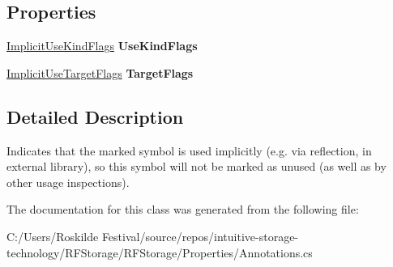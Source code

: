 \subsection*{Properties}
\begin{DoxyCompactItemize}
\item 
\mbox{\label{class_r_f_storage_1_1_used_implicitly_attribute_ab9e36ed5cfd5917dd41a9dfba527a3a4}} 
\mbox{\hyperlink{namespace_r_f_storage_a858608c6c632849e1730c5fafed9fa25}{Implicit\+Use\+Kind\+Flags}} {\bfseries Use\+Kind\+Flags}
\item 
\mbox{\label{class_r_f_storage_1_1_used_implicitly_attribute_abf4dfcac998d0d067377eb23b04670b1}} 
\mbox{\hyperlink{namespace_r_f_storage_a11267cbdad6c26a08cf6b5c281d2f67b}{Implicit\+Use\+Target\+Flags}} {\bfseries Target\+Flags}
\end{DoxyCompactItemize}


\subsection{Detailed Description}
Indicates that the marked symbol is used implicitly (e.\+g. via reflection, in external library), so this symbol will not be marked as unused (as well as by other usage inspections). 



The documentation for this class was generated from the following file\+:\begin{DoxyCompactItemize}
\item 
C\+:/\+Users/\+Roskilde Festival/source/repos/intuitive-\/storage-\/technology/\+R\+F\+Storage/\+R\+F\+Storage/\+Properties/Annotations.\+cs\end{DoxyCompactItemize}
